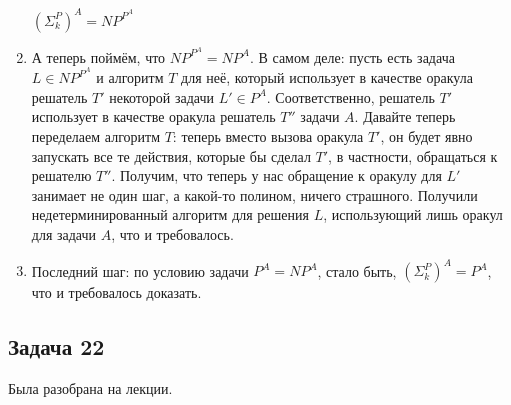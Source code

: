 \begin{enumerate}
			$\left(\Sigma_k^P\right)^A = NP^{P^A}$
		\item
			А теперь поймём, что $NP^{P^A}=NP^A$.
			В самом деле: пусть есть задача $L\in NP^{P^A}$ и алгоритм $T$ для неё, который использует в качестве оракула решатель $T'$ некоторой задачи $L'\in P^A$.
			Соответственно, решатель $T'$ использует в качестве оракула решатель $T''$ задачи $A$.
			Давайте теперь переделаем алгоритм $T$: теперь вместо вызова оракула $T'$, он будет явно запускать все те действия, которые бы сделал $T'$,
			в частности, обращаться к решателю $T''$.
			Получим, что теперь у нас обращение к оракулу для $L'$ занимает не один шаг, а какой-то полином, ничего страшного.
			Получили недетерминированный алгоритм для решения $L$, использующий лишь оракул для задачи $A$, что и требовалось.
		\item
			Последний шаг: по условию задачи $P^A=NP^A$, стало быть, $\left(\Sigma_k^P\right)^A = P^A$, что и требовалось доказать.
	\end{enumerate}

\subsection{Задача 22}
	Была разобрана на лекции.
	\TODO

